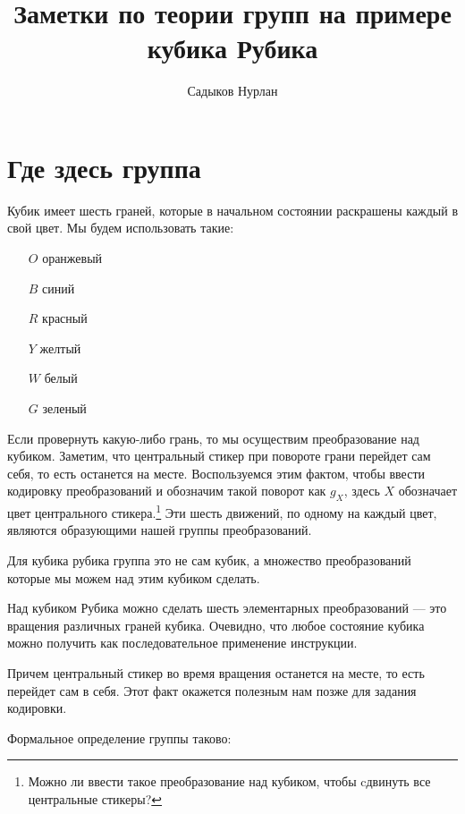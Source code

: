 \documentclass{tufte-book}
\title{Заметки по теории групп {\Huge на примере кубика Рубика}} %
\author{Садыков Нурлан}
\begin{document}
\frontmatter

\maketitle  

\section{Где здесь группа}


Кубик имеет шесть граней, которые в начальном состоянии раскрашены каждый в свой цвет. Мы будем использовать такие:
\begin{enumerate}
    \item[$O$] оранжевый
    \item[$B$] синий
    \item[$R$] красный
    \item[$Y$] желтый
    \item[$W$] белый
    \item[$G$] зеленый
\end{enumerate}

Если провернуть какую-либо грань, то мы осуществим преобразование над кубиком.
Заметим, что центральный стикер при повороте грани перейдет сам себя, то есть
останется на месте. Воспользуемся этим фактом, чтобы ввести кодировку
преобразований и обозначим такой поворот как $g_X$, здесь $X$ обозначает цвет
центрального стикера.\footnote{Можно ли ввести такое преобразование над
кубиком, чтобы cдвинуть все центральные стикеры?} Эти шесть движений, по одному
на каждый цвет, являются образующими нашей группы преобразований.

Для кубика рубика группа это не сам кубик, а множество преобразований которые
мы можем над этим кубиком сделать. 

Над кубиком Рубика можно сделать шесть элементарных преобразований --- это
вращения различных граней кубика. Очевидно, что любое состояние кубика можно получить как последовательное применение инструкции.

Причем центральный стикер во время вращения
останется на месте, то есть перейдет сам в себя. Этот факт окажется полезным
нам позже для задания кодировки.




Формальное определение группы таково:
\end{document}

